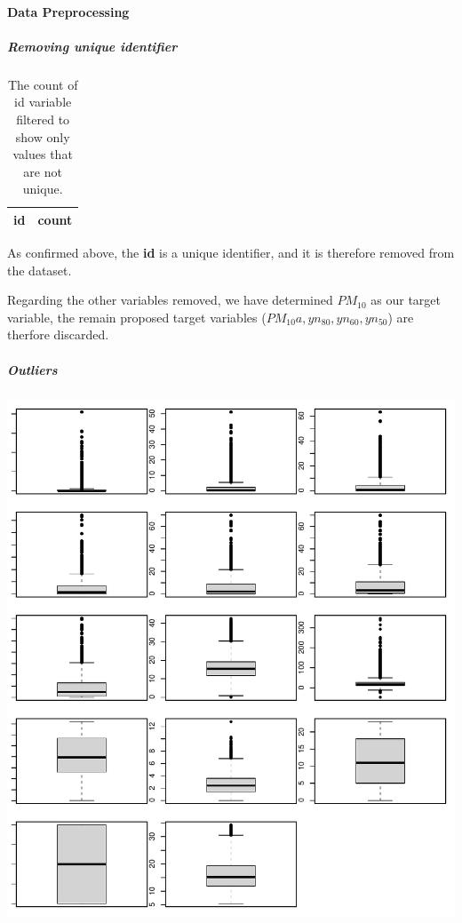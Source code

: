 \documentclass[12pt]{article}
\begin{document}
\hypertarget{data-preprocessing}{%
\paragraph{Data Preprocessing}\label{data-preprocessing}}

\hypertarget{removing-unique-identifier}{%
\subparagraph{Removing unique
identifier}\label{removing-unique-identifier}}

\begin{table}

\caption{\label{tab:unnamed-chunk-5}The count of id variable filtered to show only values that are not unique.}
\centering
\begin{tabu} to 
\hline
id & count\\


\hline
\end{tabu}
\end{table}

As confirmed above, the \textbf{id} is a unique identifier, and it is
therefore removed from the dataset.

Regarding the other variables removed, we have determined \(PM_{10}\) as
our target variable, the remain proposed target variables
(\(PM_{10}a, yn_{80}, yn_{60}, yn_{50}\)) are therfore discarded.

\hypertarget{outliers}{%
\subparagraph{Outliers}\label{outliers}}

\includegraphics{MATH2269_final_project_files/figure-latex/unnamed-chunk-8-1.pdf}
\end{document}

